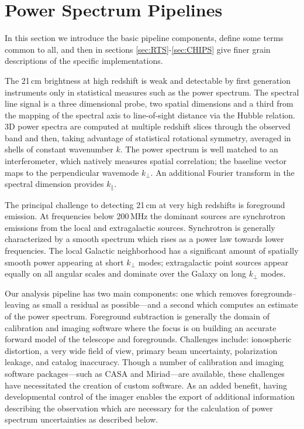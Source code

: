 \documentclass[twolcolumn,iop]{emulateapj}
\begin{document}
\section{Power Spectrum Pipelines}
\label{sec:pipelines}
In this section we introduce the basic pipeline components, define some terms common to all, and then in sections \ref{sec:RTS}-\ref{sec:CHIPS} give finer grain descriptions of the specific implementations.

The 21\,cm brightness at high redshift is weak and detectable by first generation instruments only in	 statistical measures such as the power spectrum. The spectral line signal is a three dimensional probe, two spatial dimensions and a third from the mapping of the spectral axis to line-of-sight distance via the Hubble relation. 3D power spectra are computed at multiple redshift slices through the observed band and then, taking advantage of statistical rotational symmetry, averaged in shells of constant wavenumber $k$.  The power spectrum is well matched to an interferometer, which natively measures spatial correlation; the baseline vector maps to the perpendicular wavemode $k_\perp$.  An additional Fourier transform in the spectral dimension provides $k_\parallel$.  

The principal challenge to detecting 21\,cm at very high redshifts is foreground emission. At frequencies below 200\,MHz the dominant sources are synchrotron emissions from the local and extragalactic sources. Synchrotron is generally characterized by a smooth spectrum which rises as a power law towards lower frequencies. The local Galactic neighborhood has a significant amount of spatially smooth power appearing at short $k_\perp$ modes; extragalactic point sources appear equally on all angular scales and dominate over the Galaxy on long $k_\perp$ modes. 



Our analysis pipeline has two main components: one which removes foregrounds--leaving as small a residual as possible---and a second which computes an estimate of the power spectrum.   Foreground subtraction is generally the domain of calibration and imaging software where the focus is on building an accurate forward model of the telescope and foregrounds.  Challenges include: ionospheric distortion, a very wide field of view, primary beam uncertainty, polarization leakage, and catalog inaccuracy. Though a number of calibration and imaging software packages---such as CASA and Miriad---are available, these challenges have necessitated the creation of custom software.  As an added benefit, having developmental control of the imager enables the export of additional information describing the observation which are necessary for the calculation of power spectrum uncertainties as described below. 
\end{document}
